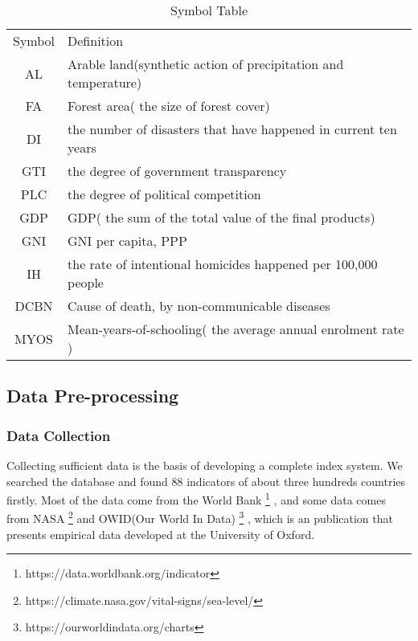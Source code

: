 \documentclass{mcmthesis}
\begin{document}
		\begin{table}[h]
			\caption{Symbol Table}
			\centering
			\renewcommand\arraystretch{1.32}
			\begin{tabular}{c l}
				\hline
				Symbol & Definition\\
				\noalign{\global\arrayrulewidth1pt}\hline\noalign{\global\arrayrulewidth0.9pt}
				AL & Arable land(synthetic action of precipitation and temperature) \\
				FA &	Forest area( the size of forest cover) \\
				DI &	the number of  disasters that have happened in current ten years \\
				GTI &	the degree of government transparency\\
				PLC &	the degree of political competition\\
				GDP &	GDP( the sum of the total value of the final products)\\
				GNI &	GNI per capita, PPP\\
				IH &	 the rate of intentional homicides happened per 100,000 people \\
				DCBN &	Cause of death, by non-communicable diseases\\ 
				MYOS &	Mean-years-of-schooling( the average annual enrolment rate )\\
				\hline
				
			\end{tabular}
		\end{table}
	
		\subsection{Data Pre-processing}
		
			\subsubsection{Data Collection}
				Collecting sufficient data is the basis of developing a complete index system. We searched the database and found 88 indicators of about three hundreds countries firstly. Most of the data come from the World Bank
				\footnote{https://data.worldbank.org/indicator
				}
				, and some data comes from NASA 
				\footnote{https://climate.nasa.gov/vital-signs/sea-level/}
				and OWID(Our World In Data)
				\footnote{https://ourworldindata.org/charts}
				, which is an publication that presents empirical data developed at the University of Oxford.
				
\end{document}
